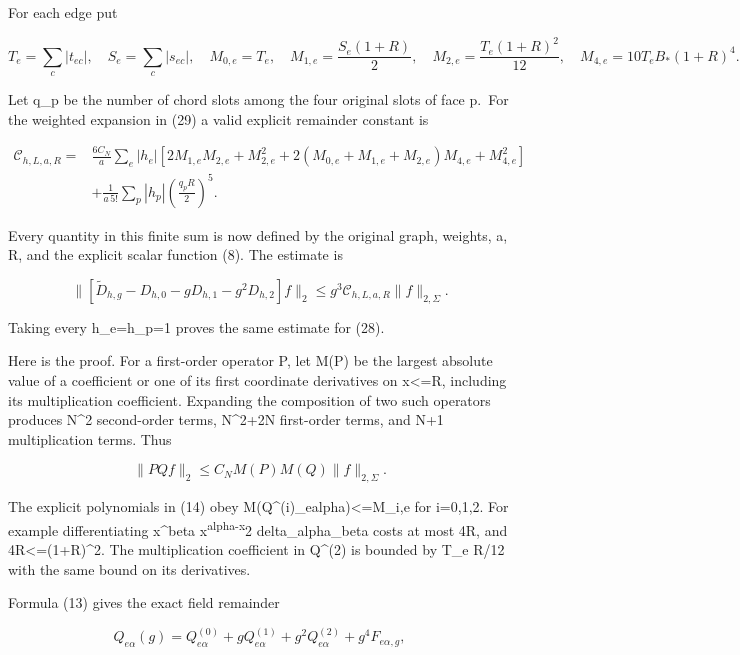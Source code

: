 \documentclass[
  11pt,
]{article}
\begin{document}
For each edge put

\[
 T_e=\sum_c|t_{ec}|,\quad S_e=\sum_c|s_{ec}|,
 \quad M_{0,e}=T_e,\quad
 M_{1,e}=\frac{S_e(1+R)}2,\quad
 M_{2,e}=\frac{T_e(1+R)^2}{12},\quad
 M_{4,e}=10T_eB_*(1+R)^4.
                                                               \tag{31}
\]

Let q\_p be the number of chord slots among the four original slots of
face p.~For the weighted expansion in (29) a valid explicit remainder
constant is

\[
 \begin{split}
 \mathcal C_{h,L,a,R}={}&\frac{6C_N}{a}\sum_e|h_e|
 \left[2M_{1,e}M_{2,e}+M_{2,e}^2
  +2(M_{0,e}+M_{1,e}+M_{2,e})M_{4,e}+M_{4,e}^2\right]\\
 &+\frac1{a\,5!}\sum_p|h_p|\left(\frac{q_pR}{2}\right)^5.
                                                               \tag{32}
\end{split}
\]

Every quantity in this finite sum is now defined by the original graph,
weights, a, R, and the explicit scalar function (8). The estimate is

\[
 \boxed{
 \|[\widetilde D_{h,g}-D_{h,0}-gD_{h,1}-g^2D_{h,2}]f\|_2
       \le g^3\mathcal C_{h,L,a,R}\|f\|_{2,\Sigma}.}
                                                               \tag{33}
\]

Taking every h\_e=h\_p=1 proves the same estimate for (28).

Here is the proof. For a first-order operator P, let M(P) be the largest
absolute value of a coefficient or one of its first coordinate
derivatives on \textbar x\textbar\textless=R, including its
multiplication coefficient. Expanding the composition of two such
operators produces N\^{}2 second-order terms, N\^{}2+2N first-order
terms, and N+1 multiplication terms. Thus

\[
 \|PQf\|_2\le C_N M(P)M(Q)\|f\|_{2,\Sigma}.              \tag{34}
\]

The explicit polynomials in (14) obey
M(Q\^{}(i)\_ealpha)\textless=M\_i,e for i=0,1,2. For example
differentiating x\^{}beta x\textsuperscript{alpha-\textbar x\textbar{}}2
delta\_alpha\_beta costs at most 4R, and 4R\textless=(1+R)\^{}2. The
multiplication coefficient in Q\^{}(2) is bounded by T\_e R/12 with the
same bound on its derivatives.

Formula (13) gives the exact field remainder

\[
 Q_{e\alpha}(g)=Q^{(0)}_{e\alpha}+gQ^{(1)}_{e\alpha}
                 +g^2Q^{(2)}_{e\alpha}+g^4F_{e\alpha,g},
\]
\end{document}
